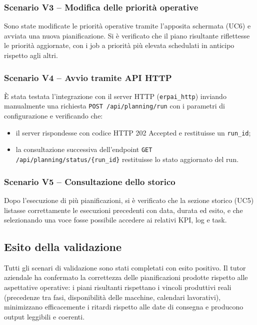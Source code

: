 \subsubsection{Scenario V3 -- Modifica delle priorità operative}
Sono state modificate le priorità operative tramite l'apposita schermata (UC6) e avviata una nuova pianificazione. Si è verificato che il piano risultante riflettesse le priorità aggiornate, con i job a priorità più elevata schedulati in anticipo rispetto agli altri.

\subsubsection{Scenario V4 -- Avvio tramite API HTTP}
È stata testata l'integrazione con il server HTTP (\texttt{erpai\_http}) inviando manualmente una richiesta \texttt{POST /api/planning/run} con i parametri di configurazione e verificando che:
\begin{itemize}
    \item il server rispondesse con codice HTTP 202 Accepted e restituisse un \texttt{run\_id};
    \item la consultazione successiva dell'endpoint \texttt{GET /api/planning/status/\{run\_id\}} restituisse lo stato aggiornato del run.
\end{itemize}

\subsubsection{Scenario V5 -- Consultazione dello storico}
Dopo l'esecuzione di più pianificazioni, si è verificato che la sezione storico (UC5) listasse correttamente le esecuzioni precedenti con data, durata ed esito, e che selezionando una voce fosse possibile accedere ai relativi KPI, log e task.

\subsection{Esito della validazione}

Tutti gli scenari di validazione sono stati completati con esito positivo. Il tutor aziendale ha confermato la correttezza delle pianificazioni prodotte rispetto alle aspettative operative: i piani risultanti rispettano i vincoli produttivi reali (precedenze tra fasi, disponibilità delle macchine, calendari lavorativi), minimizzano efficacemente i ritardi rispetto alle date di consegna e producono output leggibili e coerenti.

